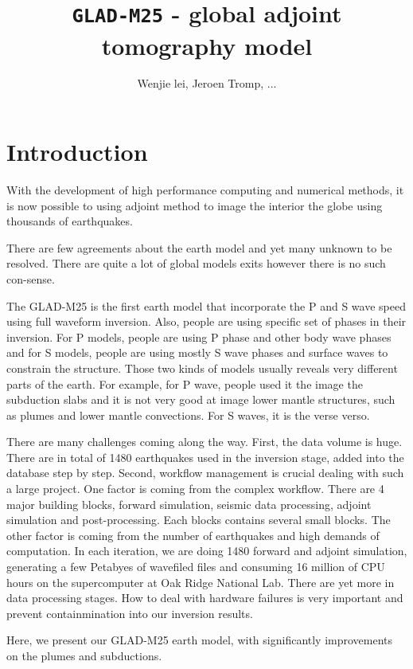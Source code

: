 \documentclass[extra,mreferee]{gji}
\title[\texttt{gji\_extra.sty} ]
  {\texttt{GLAD-M25} - global adjoint tomography model}
\author[]  {Wenjie lei, Jeroen Tromp, ...}
\begin{document}
\maketitle

\section{Introduction}
With the development of high performance computing and numerical methods, it is now possible to using adjoint method to image the interior the globe using thousands of earthquakes.

There are few agreements about the earth model and yet many unknown to be resolved. There are quite a lot of global models exits however there is no such con-sense.

The GLAD-M25 is the first earth model that incorporate the P and S wave speed using full waveform inversion. Also, people are using specific set of phases in their inversion. For P models, people are using P phase and other body wave phases and for S models, people are using mostly S wave phases and surface waves to constrain the structure. Those two kinds of models usually reveals very different parts of the earth. For example, for P wave, people used it the image the subduction slabs and it is not very good at image lower mantle structures, such as plumes and lower mantle convections. For S waves, it is the verse verso.

There are many challenges coming along the way. First, the data volume is huge.  There are in total of 1480 earthquakes used in the inversion stage, added into the database step by step. Second, workflow management is crucial dealing with such a large project. One factor is coming from the complex workflow. There are 4 major building blocks, forward simulation, seismic data processing, adjoint simulation and post-processing. Each blocks contains several small blocks. The other factor is coming from the number of earthquakes and high demands of computation. In each iteration, we are doing 1480 forward and adjoint simulation, generating a few Petabyes of wavefiled files and consuming 16 million of CPU hours on the supercomputer at Oak Ridge National Lab. There are yet more in data processing stages. How to deal with hardware failures is very important and prevent containmination into our inversion results.

Here, we present our GLAD-M25 earth model, with significantly improvements on the plumes and subductions.
\end{document}
